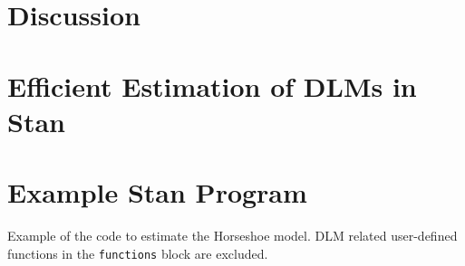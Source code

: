 \section{Discussion}
\label{dlm:sec:discussion}






\section{Efficient Estimation of DLMs in Stan}
\label{dlm:sec:effic-estim-dlms}


\section{Example Stan Program}
\label{dlm:sec:example-stan-program}

Example of the code to estimate the Horseshoe model. DLM related user-defined functions in the \texttt{functions} block are excluded.

\inputminted[firstline=5,style=bw]{stan}{../dlm-shrinkage/stan/changepoint_horseshoe.stan.mustache}  


